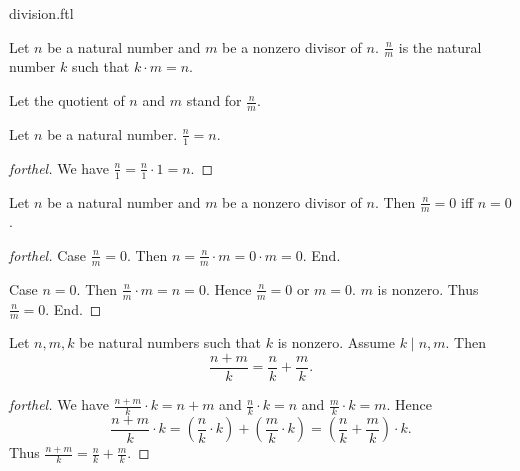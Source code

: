 \documentclass{naproche-library}
\begin{document}
\begin{smodule}[title=Division]{division.ftl}

\begin{definition}[forthel,id=ARITHMETIC_14_2313654268297915]
  Let $n$ be a natural number and $m$ be a nonzero divisor of $n$.
  $\frac{n}{m}$ is the natural number $k$ such that $k \cdot m = n$.
\end{definition}

Let the quotient of $n$ and $m$ stand for $\frac{n}{m}$.

\begin{proposition}[forthel,id=ARITHMETIC_14_0843793254698710]
  Let $n$ be a natural number.
  $\frac{n}{1} = n$.
\end{proposition}
\begin{proof}[forthel]
  We have $\frac{n}{1}
    = \frac{n}{1} \cdot 1
    = n$.
\end{proof}

\begin{proposition}[forthel,id=ARITHMETIC_14_1254235698632545]
  Let $n$ be a natural number and $m$ be a nonzero divisor of $n$.
  Then $\frac{n}{m} = 0$ iff $n = 0$.
\end{proposition}
\begin{proof}[forthel]
  Case $\frac{n}{m} = 0$.
    Then $n
      = \frac{n}{m} \cdot m
      = 0 \cdot m
      = 0$.
  End.

  Case $n = 0$.
    Then $\frac{n}{m} \cdot m
      = n
      = 0$.
    Hence $\frac{n}{m} = 0$ or $m = 0$.
    $m$ is nonzero.
    Thus $\frac{n}{m} = 0$.
  End.
\end{proof}

\begin{proposition}[forthel,id=ARITHMETIC_14_5137961454123875]
  Let $n, m, k$ be natural numbers such that $k$ is nonzero.
  Assume $k \mid n,m$.
  Then \[\frac{n + m}{k} = \frac{n}{k} + \frac{m}{k}.\]
\end{proposition}
\begin{proof}[forthel]
  We have $\frac{n + m}{k} \cdot k = n + m$ and $\frac{n}{k} \cdot k = n$ and $\frac{m}{k} \cdot k = m$.
  Hence
  \[  \frac{n + m}{k} \cdot k
      = \left( \frac{n}{k} \cdot k \right) + \left( \frac{m}{k} \cdot k \right)
      = \left( \frac{n}{k} + \frac{m}{k} \right) \cdot k. \]
  Thus $\frac{n + m}{k} = \frac{n}{k} + \frac{m}{k}$.
\end{proof}


\end{smodule}
\end{document}
